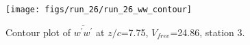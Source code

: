 \begin{figure}[H]
\centering
\texttt{[image: figs/run\_26/run\_26\_ww\_contour]}
\caption{Contour plot of $\overline{w^\prime w^\prime}$ at $z/c$=7.75, $V_{free}$=24.86, station 3.}
\label{fig:run_26_ww_contour}
\end{figure}


